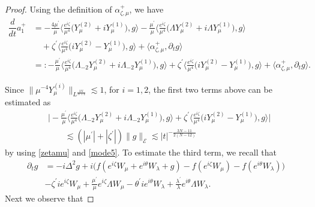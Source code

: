 \documentclass[a4paper,two-side,10pt]{amsart}
\numberwithin{equation}{section}
\begin{document}
\begin{proof}
Using the definition of $\alpha_{\zeta, \mu}^+ $, we have 
\begin{align*}
\dfrac{d}{dt} a_1^+ &= -\frac{4\mu^\prime}{\mu} \Big\langle \frac{e^{i\zeta}}{\mu^4} \big(Y^{(2)}_\mu +i  Y_\mu^{(1)}\big),g \Big\rangle
-\frac{\mu^\prime}{\mu} \Big\langle \frac{e^{i\zeta}}{\mu^4} \big(\Lambda Y^{(2)}_\mu +i \Lambda Y_\mu^{(1)}\big),g \Big\rangle\\
&\quad +\zeta^\prime \Big\langle \frac{e^{i\zeta}}{\mu^4} \big(iY_\mu^{(2)} - Y_\mu^{(1)} \big) ,g  \Big\rangle + \langle \alpha_{\zeta ,\mu}^+ , \partial_t g \rangle \\
&=:-\frac{\mu^\prime}{\mu} \Big\langle \frac{e^{i\zeta}}{\mu^4} \big(\Lambda_{-2} Y^{(2)}_\mu +i \Lambda_{-2} Y_\mu^{(1)}\big),g \Big\rangle +\zeta^\prime \Big\langle \frac{e^{i\zeta}}{\mu^4} \big(iY_\mu^{(2)} - Y_\mu^{(1)} \big) ,g  \Big\rangle + \langle \alpha_{\zeta ,\mu}^+ , \partial_t g \rangle.
\end{align*}

Since $\|\mu^{-4} Y^{(i)}_\mu\|_{L^{\frac{2N}{N+4}}} \lesssim 1$, for $i=1,2$, the first two terms above can be estimated as
\begin{align}\label{first3}
&\Big| -\frac{\mu^\prime}{\mu} \Big\langle \frac{e^{i\zeta}}{\mu^4} \big(\Lambda_{-2} Y^{(2)}_\mu +i \Lambda_{-2} Y_\mu^{(1)}\big),g \Big\rangle +\zeta^\prime \Big\langle \frac{e^{i\zeta}}{\mu^4} \big(iY_\mu^{(2)} - Y_\mu^{(1)} \big) ,g  \Big\rangle \Big|\nonumber\\
&\qquad \lesssim (|\mu^\prime| + |\zeta^\prime|)  \|g\|_{\mathcal{E}} \lesssim |t|^{-\frac{3N-11}{2(N-12)}}
\end{align}
by using \eqref{zetamu} and \eqref{mode5}. 
To estimate the third term, we recall that
\begin{align}
\label{eqdeg}
\partial_t g &=-i \Delta^2 g +i\big(f(e^{i\zeta} W_\mu +e^{i\theta} W_\lambda +g) - f(e^{i\zeta} W_\mu ) - f(e^{i\theta }W_\lambda)\big)\\
&-  \zeta^\prime i e^{i\zeta} W_\mu + \frac{\mu^\prime}{\mu} e^{i\zeta}\Lambda W_\mu -\theta^\prime i e^{i\theta} W_\lambda + \frac{\lambda^\prime}{\lambda}e^{i\theta} \Lambda W_\lambda  .\nonumber
\end{align}
Next we observe that

\end{proof}
\end{document}
